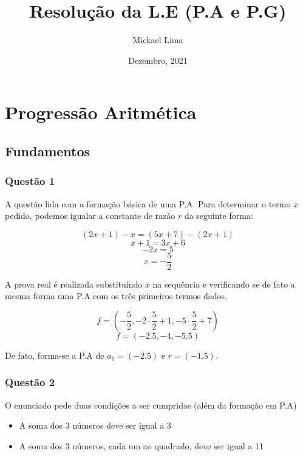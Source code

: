 \documentclass[11pt]{article}
\title{Resolução da L.E (P.A e P.G)}
\author{Mickael Lima}
\date{Dezembro, 2021}
\begin{document}
\maketitle

\section{Progressão Aritmética}

\subsection{Fundamentos}

\subsubsection{Questão 1}

A questão lida com a formação básica de uma P.A. Para determinar o termo $x$ pedido, podemos igualar a constante de razão $r$ da seguinte forma:

\begin{tcolorbox}[colback=LightYellow]
\[(2x + 1) - x = (5x + 7) - (2x + 1)\]
\[x + 1 = 3x + 6\]
\[-2x = 5\]
\[x = -\frac{5}{2}\]
\end{tcolorbox}

A prova real é realizada substituíndo $x$ na sequência e verificando se de fato a mesma forma uma P.A com os três primeiros termos dados.

\begin{tcolorbox}[colback=LightYellow]
\[f = \left(-\frac{5}{2}, -2\cdot \frac{5}{2} + 1, -5\cdot \frac{5}{2} + 7 \right)\]
\[f = \left(-2.5, -4, -5.5\right)\]
\end{tcolorbox}

De fato, forma-se a P.A de $a_{1} = (-2.5)$ e $r = (-1.5)$.

\subsubsection{Questão 2}

O enunciado pede duas condições a ser cumpridas (além da formação em P.A)

\begin{itemize}
  \item A soma dos 3 números deve ser igual a 3
  \item A soma dos 3 números, cada um ao quadrado, deve ser igual a 11
\end{itemize}
\end{document}
